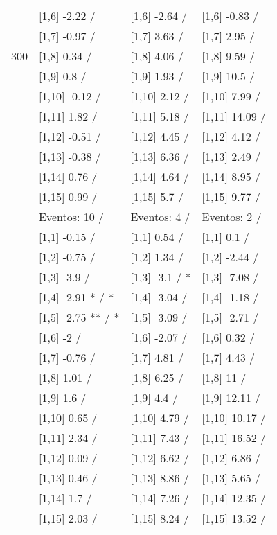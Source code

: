 \begin{table}
\begin{tabular}[t]{llll}
 & {}[1,6] -2.22  / & {}[1,6] -2.64  / & {}[1,6] -0.83  /\\
 & {}[1,7] -0.97  / & {}[1,7] 3.63  / & {}[1,7] 2.95  /\\
300 & {}[1,8] 0.34  / & {}[1,8] 4.06  / & {}[1,8] 9.59  /\\
\addlinespace
 & {}[1,9] 0.8  / & {}[1,9] 1.93  / & {}[1,9] 10.5  /\\
 & {}[1,10] -0.12  / & {}[1,10] 2.12  / & {}[1,10] 7.99  /\\
 & {}[1,11] 1.82  / & {}[1,11] 5.18  / & {}[1,11] 14.09  /\\
 & {}[1,12] -0.51  / & {}[1,12] 4.45  / & {}[1,12] 4.12  /\\
 & {}[1,13] -0.38  / & {}[1,13] 6.36  / & {}[1,13] 2.49  /\\
\addlinespace
 & {}[1,14] 0.76  / & {}[1,14] 4.64  / & {}[1,14] 8.95  /\\
 & {}[1,15] 0.99  / & {}[1,15] 5.7  / & {}[1,15] 9.77  /\\
 & Eventos:  10 / & Eventos:  4 / & Eventos:  2 /\\
 & {}[1,1] -0.15  / & {}[1,1] 0.54  / & {}[1,1] 0.1  /\\
 & {}[1,2] -0.75  / & {}[1,2] 1.34  / & {}[1,2] -2.44  /\\
\addlinespace
 & {}[1,3] -3.9  / & {}[1,3] -3.1  / * & {}[1,3] -7.08  /\\
 & {}[1,4] -2.91 * / * & {}[1,4] -3.04  / & {}[1,4] -1.18  /\\
 & {}[1,5] -2.75 ** / * & {}[1,5] -3.09  / & {}[1,5] -2.71  /\\
 & {}[1,6] -2  / & {}[1,6] -2.07  / & {}[1,6] 0.32  /\\
 & {}[1,7] -0.76  / & {}[1,7] 4.81  / & {}[1,7] 4.43  /\\
\addlinespace
500 & {}[1,8] 1.01  / & {}[1,8] 6.25  / & {}[1,8] 11  /\\
 & {}[1,9] 1.6  / & {}[1,9] 4.4  / & {}[1,9] 12.11  /\\
 & {}[1,10] 0.65  / & {}[1,10] 4.79  / & {}[1,10] 10.17  /\\
 & {}[1,11] 2.34  / & {}[1,11] 7.43  / & {}[1,11] 16.52  /\\
 & {}[1,12] 0.09  / & {}[1,12] 6.62  / & {}[1,12] 6.86  /\\
\addlinespace
 & {}[1,13] 0.46  / & {}[1,13] 8.86  / & {}[1,13] 5.65  /\\
 & {}[1,14] 1.7  / & {}[1,14] 7.26  / & {}[1,14] 12.35  /\\
 & {}[1,15] 2.03  / & {}[1,15] 8.24  / & {}[1,15] 13.52  /\\
\bottomrule
\end{tabular}
\end{table}
